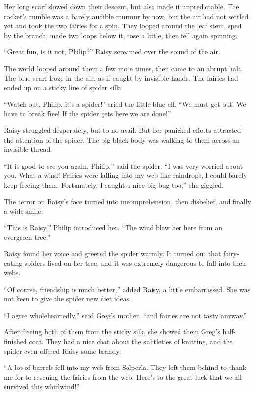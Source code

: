 \documentclass[10pt, draft]{memoir}
\begin{document}
Her long scarf slowed down their descent, but also made it unpredictable. The rocket's rumble was a barely audible murmur by now, but the air had not settled yet and took the two fairies for a spin. They looped around the leaf stem, sped by the branch, made two loops below it, rose a little, then fell again spinning.

``Great fun, is it not, Philip?'' Raisy screamed over the sound of the air.

The world looped around them a few more times, then came to an abrupt halt. The blue scarf froze in the air, as if caught by invisible hands. The fairies had ended up on a sticky line of spider silk.

``Watch out, Philip, it's a spider!'' cried the little blue elf. ``We must get out! We have to break free! If the spider gets here we are done!''

Raisy struggled desperately, but to no avail. But her panicked efforts attracted the attention of the spider. The big black body was walking to them across an invisible thread.

``It is good to see you again, Philip,'' said the spider. ``I was very worried about you. What a wind! Fairies were falling into my web like raindrops, I could barely keep freeing them. Fortunately, I caught a nice big bug too,'' she giggled.

The terror on Raisy's face turned into incomprehension, then disbelief, and finally a wide smile.

``This is Raisy,'' Philip introduced her. ``The wind blew her here from an evergreen tree.''

Raisy found her voice and greeted the spider warmly. It turned out that fairy-eating spiders lived on her tree, and it was extremely dangerous to fall into their webs.

``Of course, friendship is much better,'' added Raisy, a little embarrassed. She was not keen to give the spider new diet ideas.

``I agree wholeheartedly,'' said Greg's mother, ``and fairies are not tasty anyway.''

After freeing both of them from the sticky silk, she showed them Greg's half-finished coat. They had a nice chat about the subtleties of knitting, and the spider even offered Raisy some brandy.

``A lot of barrels fell into my web from Solperla. They left them behind to thank me for to rescuing the fairies from the web. Here's to the great luck that we all survived this whirlwind!''
\end{document}
